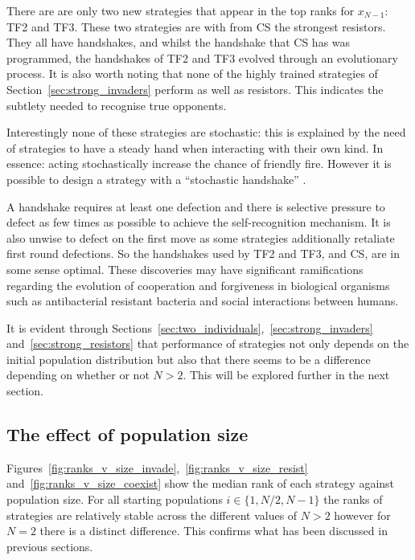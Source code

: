 \documentclass{article}
\begin{document}
There are are only two new strategies that appear in the top ranks for
\(x_{N-1}\): TF2 and TF3. These two strategies are with from CS the strongest
resistors. They all have handshakes, and whilst the handshake that CS has was
programmed, the handshakes of TF2 and TF3 evolved through an evolutionary
process. It is also worth noting that none of the highly trained strategies of
Section~\ref{sec:strong_invaders} perform as well as resistors. This indicates
the subtlety needed to recognise true opponents.

Interestingly none of these strategies are stochastic: this is explained by
the need of strategies to have a steady hand when interacting with their own
kind. In essence: acting stochastically increase the chance of friendly fire.
However it is possible to design a strategy with a ``stochastic
handshake'' \cite{Lee2015}.

A handshake requires at least one defection and there is
selective pressure to defect as few times as possible to achieve the
self-recognition mechanism. It is also unwise to defect on the first move as
some strategies additionally retaliate first round defections. So the
handshakes used by TF2 and TF3, and CS, are in some sense optimal.  These
discoveries may have significant ramifications regarding the evolution of
cooperation and forgiveness in biological organisms such as antibacterial
resistant bacteria and social interactions
between humans.

It is evident through
Sections~\ref{sec:two_individuals},~\ref{sec:strong_invaders}
and~\ref{sec:strong_resistors} that performance of strategies not only depends
on the initial population distribution but also that there seems to be a
difference depending on whether or not \(N>2\). This will be explored further in
the next section.

\subsection{The effect of population size}\label{sec:population_size}

Figures~\ref{fig:ranks_v_size_invade},~\ref{fig:ranks_v_size_resist}
and~\ref{fig:ranks_v_size_coexist} show the median rank of each strategy against
population size. For all starting populations \(i\in\{1, N/2, N-1\}\) the ranks
of strategies are relatively stable across the different values of \(N>2\)
however for \(N=2\) there is a distinct difference. This confirms what has been
discussed in previous sections.
\end{document}
